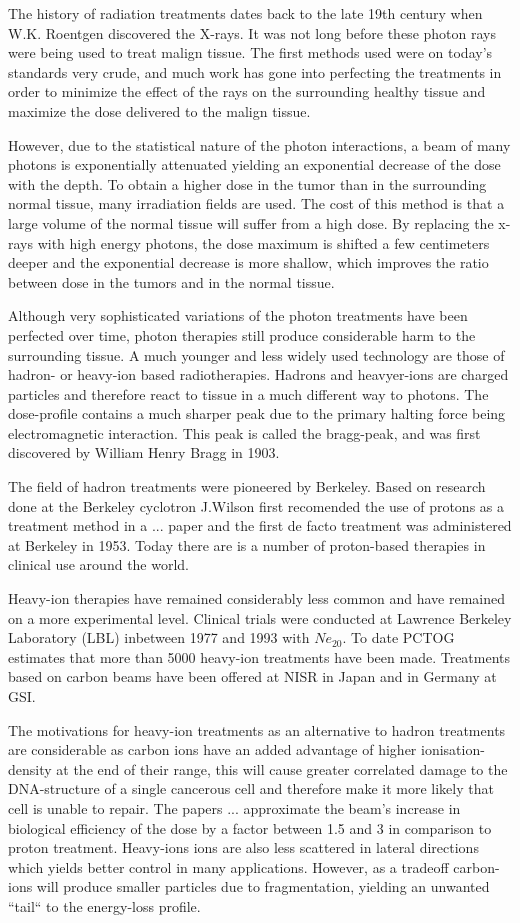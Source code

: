 The history of radiation treatments dates back to the late 19th century when W.K. Roentgen discovered the X-rays. It was not long before these photon rays were being used to treat malign tissue. The first methods used were on today's standards very crude, and much work has gone into perfecting the treatments in order to minimize the effect of the rays on the surrounding healthy tissue and maximize the dose delivered to the malign tissue.

However, due to the statistical nature of the photon interactions, a beam of many photons is
exponentially attenuated yielding an exponential decrease of the dose with the depth. To
obtain a higher dose in the tumor than in the surrounding normal tissue, many irradiation
fields are used. The cost of this method is that a large volume of the normal tissue
will suffer from a high dose. By replacing the x-rays with high energy photons, the dose
maximum is shifted a few centimeters deeper and the exponential decrease is more shallow,
which improves the ratio between dose in the tumors and in the normal tissue.

Although very sophisticated variations of the photon treatments have been perfected over time, photon therapies still produce considerable harm to the surrounding tissue. A much younger and less widely used technology are those of hadron- or heavy-ion based radiotherapies. Hadrons and heavyer-ions are charged particles and therefore react to tissue in a much different way to photons. The dose-profile contains a much sharper peak due to the primary halting force being electromagnetic interaction. This peak is called the bragg-peak, and was first discovered by William Henry Bragg in 1903.

The field of hadron treatments were pioneered by Berkeley. Based on research done at the Berkeley cyclotron J.Wilson first recomended the use of protons as a treatment method in a ... paper and the first de facto treatment was administered at Berkeley in 1953. Today there are is a number of proton-based therapies in clinical use around the world.

Heavy-ion therapies have remained considerably less common and have remained on a more experimental level. Clinical trials were conducted at Lawrence Berkeley Laboratory (LBL) inbetween 1977 and 1993 with $Ne_20$. To date PCTOG estimates that more than 5000 heavy-ion treatments have been made. Treatments based on carbon beams have been offered at NISR in Japan and in Germany at GSI.

The motivations for heavy-ion treatments as an alternative to hadron treatments are considerable as carbon ions have an added advantage of higher ionisation-density at the end of their range, this will cause greater correlated damage to the DNA-structure of a single cancerous cell and therefore make it more likely that cell is unable to repair. The papers ... approximate the beam's increase in biological efficiency of the dose by a factor between 1.5 and 3 in comparison to proton treatment. Heavy-ions ions are also less scattered in lateral directions which yields better control in many applications. However, as a tradeoff carbon-ions will produce smaller particles due to fragmentation, yielding an unwanted ``tail`` to the energy-loss profile.

